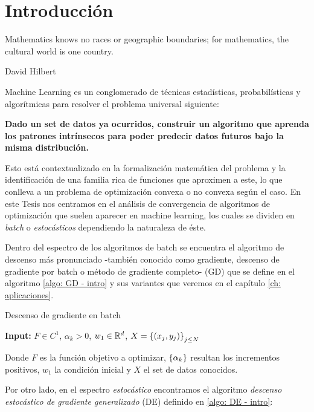 \chapter{Introducci\'on}\label{ch:introduccion}

\epigraph{Mathematics knows no races
	or geographic boundaries;
	for mathematics,
	the cultural world
	is one country.}{David Hilbert}

Machine Learning es un conglomerado de t\'ecnicas estad\'isticas, probabil\'isticas y algor\'itmicas para resolver el problema universal siguiente:

\begin{center}
\textbf{Dado un set de datos ya ocurridos, construir un algoritmo que aprenda los patrones intr\'insecos para poder predecir datos futuros bajo la misma distribuci\'on.}
\end{center}

Esto est\'a contextualizado en la formalizaci\'on matem\'atica del problema y la identificaci\'on de una familia rica de funciones que aproximen a este, lo que conlleva a un problema de optimizaci\'on convexa o no convexa seg\'un el caso. En este Tesis nos centramos en el an\'alisis de convergencia de algoritmos de optimizaci\'on que suelen aparecer en machine learning, los cuales se dividen en \textit{batch} o \textit{estoc\'asticos} dependiendo la naturaleza de \'este.

Dentro del espectro de los algoritmos de batch se encuentra el algoritmo de descenso m\'as pronunciado -tambi\'en conocido como gradiente, descenso de gradiente por batch o m\'etodo de gradiente completo- (GD) que se define en el algoritmo \ref{algo: GD - intro} y sus variantes que veremos en el cap\'itulo \ref{ch: aplicaciones}.

\LinesNumbered
\begin{algorithm}[H]
	\caption{Descenso de gradiente en batch \label{algo: GD - intro}}
	\textbf{Input:} $F \in C^1$, $\alpha_k >0$, $w_1 \in {\mathbb{R}}^d$, $X = \left\lbrace(x_j,y_j)\right\rbrace_{j \leq N}$  \\
\end{algorithm}

Donde $F$ es la funci\'on objetivo a optimizar, $\left\lbrace\alpha_k\right\rbrace$ resultan los incrementos positivos, $w_1$ la condici\'on inicial y $X$ el set de datos conocidos. 

Por otro lado, en el espectro \textit{estoc\'astico} encontramos el algoritmo \textit{descenso estoc\'astico de gradiente generalizado} (DE) definido en \ref{algo: DE - intro}:

